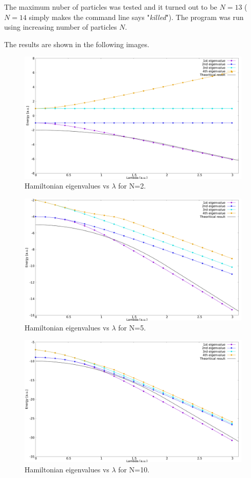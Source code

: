 \documentclass[12pt, a4paper, notitlepage]{report}
\begin{document}
The maximum nuber of particles was tested and it turned out to be $N=13$ ($N=14$ simply makes the command line says "\textit{killed}"). The program was run using increasing number of particles $N$.

The results are shown in the following images.

\begin{figure}
	\centering
	\includegraphics[scale=0.3]{4_eigval_vs_lambda_N2} 
	\caption{Hamiltonian eigenvalues vs $\lambda$ for N=2.}
	\label{figure_lambdas}
\end{figure}

\begin{figure}
	\centering
	\includegraphics[scale=0.3]{4_eigval_vs_lambda_N5} 
	\caption{Hamiltonian eigenvalues vs $\lambda$ for N=5.}
	\label{figure_lambdas}
\end{figure}

\begin{figure}
	\centering
	\includegraphics[scale=0.3]{4_eigval_vs_lambda_N10}
	\caption{Hamiltonian eigenvalues vs $\lambda$ for N=10.}
	\label{figure_lambdas}
\end{figure}
\end{document}
